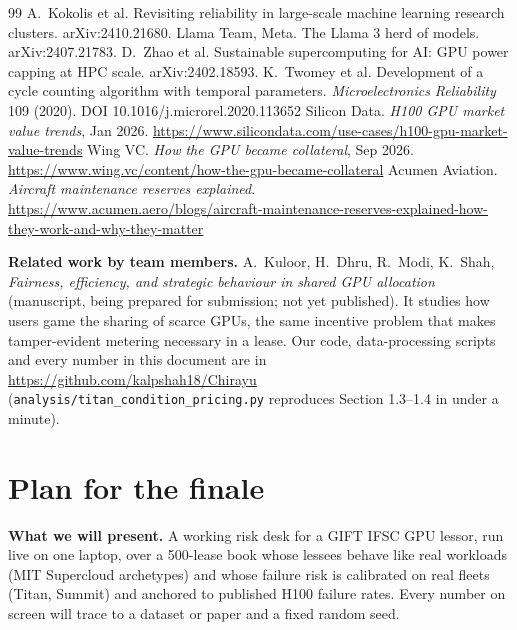 \documentclass[10pt]{article}
\begin{document}
\begin{thebibliography}{99}
 A.~Kokolis et al. Revisiting reliability in large-scale machine learning research clusters. arXiv:2410.21680.
 Llama Team, Meta. The Llama 3 herd of models. arXiv:2407.21783.
 D.~Zhao et al. Sustainable supercomputing for AI: GPU power capping at HPC scale. arXiv:2402.18593.
 K.~Twomey et al. Development of a cycle counting algorithm with temporal parameters. \emph{Microelectronics Reliability} 109 (2020). DOI 10.1016/j.microrel.2020.113652
 Silicon Data. \emph{H100 GPU market value trends}, Jan 2026. \url{https://www.silicondata.com/use-cases/h100-gpu-market-value-trends}
 Wing VC. \emph{How the GPU became collateral}, Sep 2026. \url{https://www.wing.vc/content/how-the-gpu-became-collateral}
 Acumen Aviation. \emph{Aircraft maintenance reserves explained}. \url{https://www.acumen.aero/blogs/aircraft-maintenance-reserves-explained-how-they-work-and-why-they-matter}

\end{thebibliography}
\endgroup

\textbf{Related work by team members.} A.~Kuloor, H.~Dhru, R.~Modi, K.~Shah, \emph{Fairness, efficiency, and strategic behaviour in shared GPU allocation} (manuscript, being prepared for submission; not yet published). It studies how users game the sharing of scarce GPUs, the same incentive problem that makes tamper-evident metering necessary in a lease. Our code, data-processing scripts and every number in this document are in \url{https://github.com/kalpshah18/Chirayu} (\texttt{analysis/titan\_condition\_pricing.py} reproduces Section 1.3--1.4 in under a minute).

\section{Plan for the finale}
\textbf{What we will present.} A working risk desk for a GIFT IFSC GPU lessor, run live on one laptop, over a 500-lease book whose lessees behave like real workloads (MIT Supercloud archetypes) and whose failure risk is calibrated on real fleets (Titan, Summit) and anchored to published H100 failure rates. Every number on screen will trace to a dataset or paper and a fixed random seed.
\end{document}
